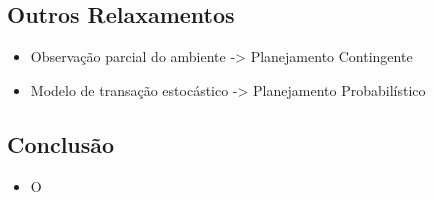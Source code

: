 \subsection{Outros Relaxamentos}
\begin{frame}
    \begin{itemize}
        \item Observação parcial do ambiente -> Planejamento Contingente
        \item Modelo de transação estocástico -> Planejamento Probabilístico
    \end{itemize}
\end{frame} 

\subsection{Conclusão}
\begin{frame}
    \begin{itemize}
        \item O 
    \end{itemize}
\end{frame} 

